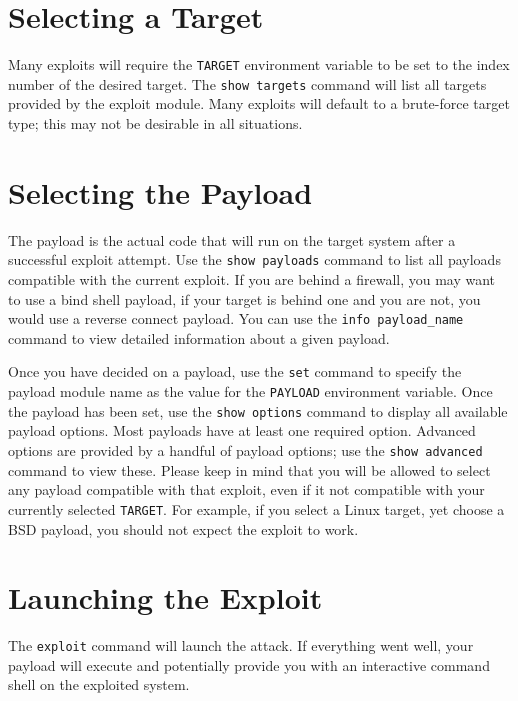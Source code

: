 \documentclass{report}
\begin{document}
	\section{Selecting a Target}
\par
Many exploits will require the \texttt{TARGET} environment variable to be set to the
index number of the desired target. The \texttt{show targets} command will list all
targets provided by the exploit module. Many exploits will default to a
brute-force target type; this may not be desirable in all situations. 

	\section{Selecting the Payload}
\par	
The payload is the actual code that will run on the target system after a
successful exploit attempt. Use the \texttt{show payloads} command to list all payloads
compatible with the current exploit. If you are behind a firewall, you may want
to use a bind shell payload, if your target is behind one and you are not, you
would use a reverse connect payload. You can use the \texttt{info payload\_name} command
to view detailed information about a given payload.  

\par
Once you have decided on a payload, use the \texttt{set} command to specify the payload
module name as the value for the \texttt{PAYLOAD} environment variable. Once the payload
has been set, use the \texttt{show options} command to display all available payload
options. Most payloads have at least one required option. Advanced options are
provided by a handful of payload options; use the \texttt{show advanced} command to view
these. Please keep in mind that you will be allowed to select any payload
compatible with that exploit, even if it not compatible with your currently
selected \texttt{TARGET}. For example, if you select a Linux target, yet choose
a BSD payload, you should not expect the exploit to work.


	\section{Launching the Exploit}
\par
The \texttt{exploit} command will launch the attack. If everything went well, your
payload will execute and potentially provide you with an interactive command
shell on the exploited system. 
\end{document}
